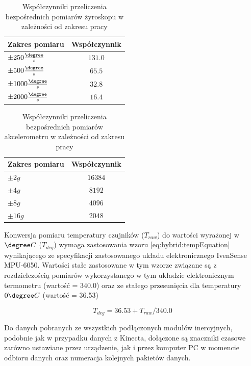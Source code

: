 \begin{table}[!htp]
	\centering
	\caption{Współczynniki przeliczenia bezpośrednich pomiarów żyroskopu w zależności od zakresu pracy}	
	\label{tab:hybrid:gyroRangeFactors}	
	\begin{tabular}{|l|c|}
		\hline
		Zakres pomiaru                     & Współczynnik  \\ \hline
		$\pm250\frac{\degree}{s}$          & $131.0$         \\ \hline
		\textbf{$\pm500\frac{\degree}{s}$} & \textbf{$65.5$} \\ \hline
		$\pm1000\frac{\degree}{s}$         & $32.8$          \\ \hline
		$\pm2000\frac{\degree}{s}$         & $16.4$          \\ \hline
	\end{tabular}
\end{table} 		
\begin{table}[!htp]
	\centering
	\caption{Współczynniki przeliczenia bezpośrednich pomiarów akcelerometru w zależności od zakresu pracy}
	\label{tab:hybrid:accRangeFactors} 
	\begin{tabular}{|l|c|}
		\hline
		Zakres pomiaru   & Współczynnik  \\ \hline
		$\pm2g$          & $16384$         \\ \hline
		\textbf{$\pm4g$} & \textbf{$8192$} \\ \hline
		$\pm8g$          & $4096$          \\ \hline
		$\pm16g$         & $2048$          \\ \hline
	\end{tabular}
\end{table} 

Konwersja pomiaru temperatury czujników ($T_{raw}$) do wartości wyrażonej w $\degree C$ ($T_{deg}$) wymaga zastosowania wzoru \eqref{eq:hybrid:tempEquation} wynikającego ze specyfikacji zastosowanego układu elektronicznego IvenSense MPU-6050. Wartości stałe zastosowane w tym wzorze związane są z rozdzielczością pomiarów wykorzystanego w tym układzie elektronicznym termometru (wartość = 340.0) oraz ze stałego przesunięcia dla temperatury $0 \degree C$ (wartość = 36.53)

\begin{equation}
	T_{deg} = 36.53 + T_{raw} / 340.0
	\label{eq:hybrid:tempEquation}
\end{equation}

Do danych pobranych ze wszystkich podłączonych modułów inercyjnych, podobnie jak w przypadku danych z Kinecta, dołączone są znaczniki czasowe zarówno ustawiane przez urządzenie, jak i przez komputer PC w momencie odbioru danych oraz numeracja kolejnych pakietów danych.

